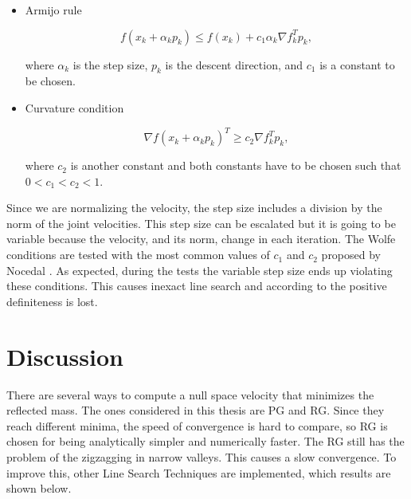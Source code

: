 \begin{itemize}
	\item Armijo rule
	
	\begin{equation}
	f(x_k +  \alpha_k p_k) \le f(x_k) + c_1 \alpha_k \nabla f_k^{T} p_k ,
 	\end{equation}
	
	where $\alpha_k $ is the step size, $p_k$ is the descent direction, and $c_1$ is a constant to be chosen.
	
	\item Curvature condition
	
	\begin{equation}
	\nabla f(x_k + \alpha_k p_k)^{T} \ge  c_2 \nabla f_k^{T} p_k  ,
	\end{equation}	
	
	where $c_2$ is another constant and both constants have to be chosen such that $ 0 < c_1 < c_2 < 1 $.
	
	
\end{itemize}





Since we are normalizing the velocity, the step size includes a division by the norm of the joint velocities. This step size can be escalated but it is going to be variable because the velocity, and its norm, change in each iteration. 
The Wolfe conditions are tested with the most common values of $c_1$ and $c_2$ proposed by Nocedal \cite{Nocedal2006NO}.
As expected, during the tests
the variable step size ends up violating these conditions. This causes inexact line search and according to \cite{intro_opt_design} the positive definiteness is lost.%

\section{Discussion}
\label{sec:comparison_local_minim}


There are several ways to compute a null space velocity that minimizes the reflected mass. The ones considered in this thesis are PG and RG. Since they reach  different minima, the speed of convergence is hard to compare, so RG is chosen for being analytically simpler and numerically faster. The RG still has the problem of the zigzagging in narrow valleys. This causes a slow convergence. To improve this, other Line Search Techniques are implemented, which results are shown below.



